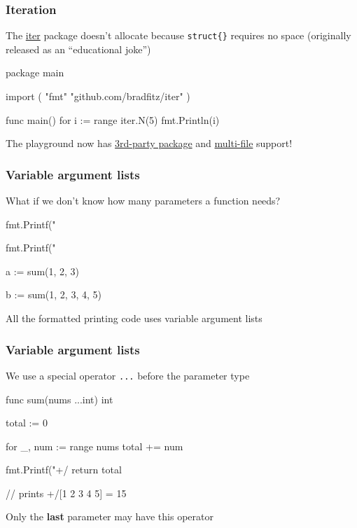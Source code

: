 \documentclass[handout,compress,t,11pt]{beamer}
\begin{document}
\begin{frame}[fragile]
    \frametitle{Iteration}
The \href{https://godoc.org/github.com/bradfitz/iter}{iter} package doesn't
allocate because \verb|struct{}| requires no space (originally released as an 
``educational joke'')
\vspace{0.4\baselineskip}
\begin{golang}
package main

import (
	"fmt"
	"github.com/bradfitz/iter"
)

func main() {
	for i := range iter.N(5) {
		fmt.Println(i)
	}
}
\end{golang}
\vspace{0.4\baselineskip}
The playground now has \href{https://play.golang.org/p/eqEo7mqdS9l}{3rd-party package} and
\href{https://play.golang.org/p/KLZR7NlVZNX}{multi-file} support!
\end{frame}

\begin{frame}[fragile]
    \frametitle{Variable argument lists}
    What if we don't know how many parameters a function needs?
\vspace{\baselineskip}
\begin{golang}
    fmt.Printf("%
    
    fmt.Printf("%
    
    a := sum(1, 2, 3)

    b := sum(1, 2, 3, 4, 5)
\end{golang}
\vspace{2\baselineskip}
All the formatted printing code uses variable argument lists
\end{frame}

\begin{frame}[fragile]
    \frametitle{Variable argument lists}
    We use a special operator \verb|...| before the parameter type
\begin{golang}
func sum(nums ...int) int {
    total := 0

    for _, num := range nums {
        total += num
    }

	fmt.Printf("+/%
    return total
}

// prints +/[1 2 3 4 5] = 15
\end{golang}
\vspace{\baselineskip}
Only the {\bf last} parameter may have this operator
\end{frame}
\end{document}
